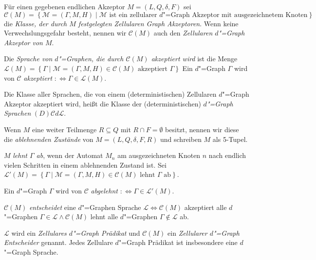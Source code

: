 \documentclass[11pt]{article}
\newcommand{\defWord}[1]{\emph{#1}}
\begin{document}
\begin{definition}[Sprachen]
	Für einen gegebenen endlichen Akzeptor $M = \left(L, Q, \delta, F\right)$ sei $\mathcal{C} \left(M\right) = \left\{\mathcal{M} = \left(\Gamma, M, H\right) \mid \mathcal{M} \text{ ist ein zellularer $d$"=Graph Akzeptor mit ausgezeichnetem Knoten} \right\}$  die \defWord{Klasse, der durch $M$ festgelegten Zellularen Graph Akzeptoren}. 
	Wenn keine Verwechslungsgefahr besteht, nennen wir $\mathcal{C}\left(M\right)$ auch den \defWord{Zellularen $d$"=Graph Akzeptor von $M$}.
	
	Die \defWord{Sprache von $d$"=Graphen, die durch $\mathcal{C}\left(M\right)$ akzeptiert wird} ist die Menge $\mathcal{L}\left(M\right) = \left\{\Gamma \mid \mathcal{M} = \left(\Gamma, M, H\right) \in \mathcal{C}\left(M\right) \text{ akzeptiert } \Gamma \right\}$
	Ein $d$"=Graph $\Gamma$ wird von $\mathcal{C}$ \defWord{akzeptiert} $:\iff \Gamma \in \mathcal{L}\left(M\right)$.
	
	Die Klasse aller Sprachen, die von einem (deterministischen) Zellularen $d$"=Graph Akzeptor akzeptiert wird, heißt die Klasse der (deterministischen) \defWord{$d$"=Graph Sprachen} $(D)\mathcal{C}d\mathcal{L}$. 
\end{definition}

\begin{definition}[$d$"=Graph Entscheider]
	Wenn $M$ eine weiter Teilmenge $R \subseteq Q$ mit $R \cap F = \emptyset$ besitzt, nennen wir diese die \defWord{ablehnenden Zustände} von $M = \left(L, Q, \delta, F, R\right)$ und schreiben $M$ als 5-Tupel.
	
	$M$ \defWord{lehnt $\Gamma$ ab}, wenn der Automat $M_n$ am ausgezeichneten Knoten $n$ nach endlich vielen Schritten in einem ablehnenden Zustand ist.
	Sei  $\mathcal{L}'\left(M\right) = \left\{\Gamma \mid \mathcal{M} = \left(\Gamma, M, H\right) \in \mathcal{C}\left(M\right) \text{ lehnt } \Gamma \text{ ab}\right\}$.
	
	Ein $d$"=Graph $\Gamma$ wird von $\mathcal{C}$ \defWord{abgelehnt} $:\iff \Gamma \in \mathcal{L}'\left(M\right)$.
	
	$\mathcal{C}\left(M\right)$ \defWord{entscheidet} eine $d$"=Graphen Sprache $\mathcal{L} \iff \mathcal{C}\left(M\right)$ akzeptiert alle $d$"=Graphen $\Gamma \in \mathcal{L} \land \mathcal{C}\left(M\right)$ lehnt alle $d$"=Graphen $\Gamma \notin \mathcal{L}$ ab.
	
	$\mathcal{L}$ wird ein \defWord{Zellulares $d$"=Graph Prädikat} und $\mathcal{C}\left(M\right)$ ein \defWord{Zellularer $d$"=Graph Entscheider} genannt. 
	Jedes Zellulare $d$"=Graph Prädikat ist insbesondere eine $d$"=Graph Sprache.
\end{definition}
\end{document}
